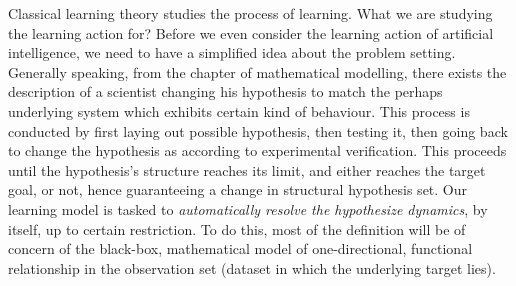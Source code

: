 Classical learning theory studies the process of learning. What we are studying the learning action for? Before we even consider the learning action of artificial intelligence, we need to have a simplified idea about the problem setting. Generally speaking, from the chapter of mathematical modelling, there exists the description of a scientist changing his hypothesis to match the perhaps underlying system which exhibits certain kind of behaviour. This process is conducted by first laying out possible hypothesis, then testing it, then going back to change the hypothesis as according to experimental verification. This proceeds until the hypothesis's structure reaches its limit, and either reaches the target goal, or not, hence guaranteeing a change in structural hypothesis set. Our learning model is tasked to \textit{automatically resolve the hypothesize dynamics}, by itself, up to certain restriction. To do this, most of the definition will be of concern of the black-box, mathematical model of one-directional, functional relationship in the observation set (dataset in which the underlying target lies). 

